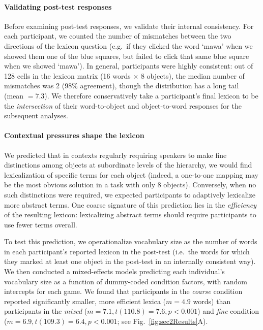 \paragraph{Validating post-test responses}

Before examining post-test responses, we validate their internal consistency.
For each participant, we counted the number of mismatches between the two directions of the lexicon question (e.g.\ if they clicked the word `mawa' when we showed them one of the blue squares, but failed to click that same blue square when we showed `mawa'). 
In general, participants were highly consistent: out of 128 cells in the lexicon matrix (16 words $\times$ 8 objects), the median number of mismatches was 2 (98\% agreement), though the distribution has a long tail (mean $= 7.3$). 
We therefore conservatively take a participant's final lexicon to be the \emph{intersection} of their word-to-object and object-to-word responses for the subsequent analyses.

\paragraph{Contextual pressures shape the lexicon}

We predicted that in contexts regularly requiring speakers to make fine distinctions among objects at subordinate levels of the hierarchy, we would find lexicalization of specific terms for each object (indeed, a one-to-one mapping may be the most obvious solution in a task with only 8 objects). 
Conversely, when no such distinctions were required, we expected participants to adaptively lexicalize more abstract terms.
One coarse signature of this prediction lies in the \emph{efficiency} of the resulting lexicon: lexicalizing abstract terms should require participants to use fewer terms overall.

To test this prediction, we operationalize vocabulary size as the number of words in each participant's reported lexicon in the post-test (i.e.\ the words for which they marked at least one object in the post-test in an internally consistent way). 
We then conducted a mixed-effects models predicting each individual's vocabulary size as a function of dummy-coded condition factors, with random intercepts for each game. 
We found that participants in the \emph{coarse} condition reported significantly smaller, more efficient  lexica ($m = 4.9$ words) than participants in the \emph{mixed} ($m=7.1, t(110.8)=7.6, p < 0.001$) and \emph{fine} condition ($m = 6.9, t(109.3) = 6.4, p < 0.001$; see Fig.\ \ref{fig:sec2Results}A). 


